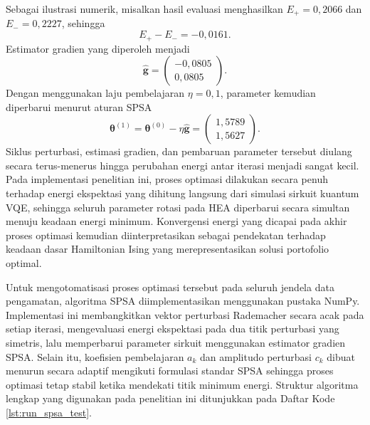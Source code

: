 Sebagai ilustrasi numerik, misalkan hasil evaluasi menghasilkan $E_{+}=0,2066$ dan $E_{-}=0,2227$, sehingga
\begin{equation}
    E_{+}-E_{-}
    =
    -0,0161.
\end{equation}
Estimator gradien yang diperoleh menjadi
\begin{equation}
    \hat{\mathbf{g}}
    =
    \begin{pmatrix}
        -0,0805\\
        0,0805
    \end{pmatrix}.
\end{equation}
Dengan menggunakan laju pembelajaran $\eta=0,1$, parameter kemudian diperbarui menurut aturan SPSA
\begin{equation}
    \boldsymbol{\theta}^{(1)}
    =
    \boldsymbol{\theta}^{(0)}
    -
    \eta
    \hat{\mathbf{g}}
    =
    \begin{pmatrix}
        1,5789\\
        1,5627
    \end{pmatrix}.
\end{equation}
Siklus perturbasi, estimasi gradien, dan pembaruan parameter tersebut diulang secara terus-menerus hingga perubahan energi antar iterasi menjadi sangat kecil. Pada implementasi penelitian ini, proses optimasi dilakukan secara penuh terhadap energi ekspektasi yang dihitung langsung dari simulasi sirkuit kuantum VQE, sehingga seluruh parameter rotasi pada HEA diperbarui secara simultan menuju keadaan energi minimum. Konvergensi energi yang dicapai pada akhir proses optimasi kemudian diinterpretasikan sebagai pendekatan terhadap keadaan dasar Hamiltonian Ising yang merepresentasikan solusi portofolio optimal.

Untuk mengotomatisasi proses optimasi tersebut pada seluruh jendela data pengamatan, algoritma SPSA diimplementasikan menggunakan pustaka NumPy. Implementasi ini membangkitkan vektor perturbasi Rademacher secara acak pada setiap iterasi, mengevaluasi energi ekspektasi pada dua titik perturbasi yang simetris, lalu memperbarui parameter sirkuit menggunakan estimator gradien SPSA. Selain itu, koefisien pembelajaran $a_k$ dan amplitudo perturbasi $c_k$ dibuat menurun secara adaptif mengikuti formulasi standar SPSA sehingga proses optimasi tetap stabil ketika mendekati titik minimum energi. Struktur algoritma lengkap yang digunakan pada penelitian ini ditunjukkan pada Daftar Kode \ref{lst:run_spsa_test}.

